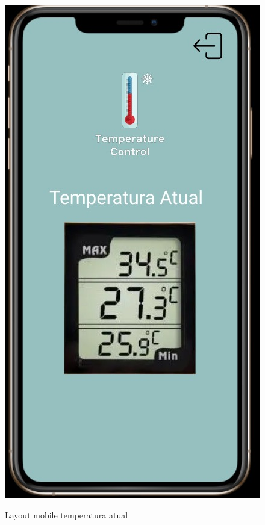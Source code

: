 \documentclass[hidelinks, 12pt, a4paper, brazil, oneside]{abntex2}
\begin{document}
    \begin{figure}[ht]
        \caption{Layout mobile temperatura atual}
        \centering
        \includegraphics[scale=0.5]{img/mobile/temp_atual.jpeg}
        \label{fig:mobileTempAtual}
    \end{figure}
\end{document}
